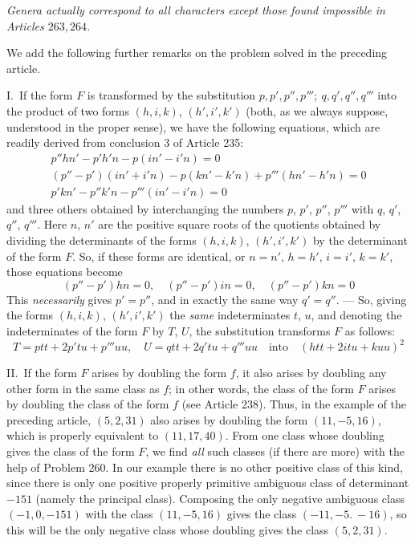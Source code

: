 \begin{center}
\textit{Genera actually correspond to all characters except those found impossible in Articles $263,264$.}
\end{center}

We add the following further remarks on the problem solved in the preceding article.

I.\ If the form $F$ is transformed by the substitution $p,p',p'',p''';\ q,q',q'',q'''$ into
the product of two forms $(h,i,k)$, $(h',i',k')$ (both, as we always
suppose, understood in the proper sense), we have the following equations,
which are readily derived from conclusion 3 of Article 235:
\[
\begin{gathered}
p''hn'-p'h'n-p(in'-i'n)=0\\
(p''-p')(in'+i'n)-p(kn'-k'n)+p'''(hn'-h'n)=0\\
p'kn'-p''k'n-p'''(in'-i'n)=0
\end{gathered}
\]
and three others obtained by interchanging the numbers $p$, $p'$,
$p''$, $p'''$ with $q$, $q'$, $q''$, $q'''$. Here $n$,
$n'$ are the positive square roots of the quotients obtained by
dividing the determinants of the forms $(h,i,k)$, $(h',i',k')$ by the determinant
of the form $F$. So, if these forms are identical, or $n=n'$,
$h=h'$, $i=i'$, $k=k'$, those equations become
\[
(p''-p')hn=0,\quad (p''-p')in=0,\quad (p''-p')kn=0
\]
This \textit{necessarily} gives $p'=p''$, and in exactly the same way
$q'=q''$. --- So, giving the forms $(h,i,k)$, $(h',i',k')$ the \textit{same}
indeterminates $t$, $u$, and denoting the indeterminates of the
form $F$ by $T$, $U$, the substitution transforms $F$ as follows:
\[
T=ptt+2p'tu+p'''uu,\quad U=qtt+2q'tu+q'''uu\quad\text{into}\quad (htt+2itu+kuu)^2
\]

II.\ If the form $F$ arises by doubling the form $f$, it also
arises by doubling any other form in the same class as $f$; in other words, the
class of the form $F$ arises by doubling the class of the form $f$
(see Article 238). Thus, in the example of the preceding article, $(5,2,31)$
also arises by doubling the form $(11,-5,16)$, which is properly equivalent
to $(11,17,40)$. From one class whose doubling gives the class of the form
$F$, we find \textit{all} such classes (if there are more) with the
help of Problem 260. In our example there is no other positive class of
this kind, since there is only one positive properly primitive ambiguous
class of determinant $-151$ (namely the principal class). Composing the
only negative ambiguous class $(-1,0,-151)$ with the class $(11,-5,16)$ gives the
class $(-11,-5.\ -16)$, so this will be the only negative class whose doubling
gives the class $(5,2,31)$.

